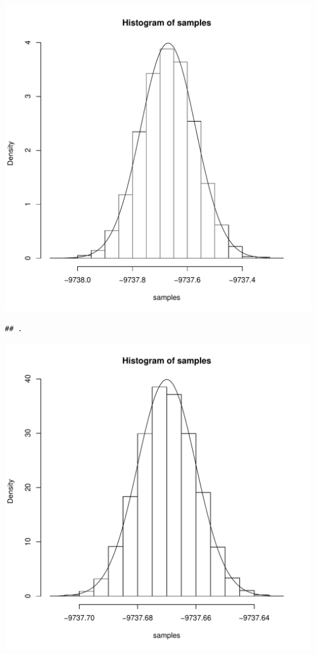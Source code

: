 \documentclass{llncs}\usepackage[]{graphicx}\usepackage[]{color}
\makeatletter
\def\maxwidth{ %
  \ifdim\Gin@nat@width>\linewidth
    \linewidth
  \else
    \Gin@nat@width
  \fi
}
\newenvironment{kframe}{%
 \def\at@end@of@kframe{}%
 \ifinner\ifhmode%
  \def\at@end@of@kframe{\end{minipage}}%
  \begin{minipage}{\columnwidth}%
 \fi\fi%
 \def\FrameCommand##1{\hskip\@totalleftmargin \hskip-\fboxsep
 \colorbox{shadecolor}{##1}\hskip-\fboxsep
     \hskip-\linewidth \hskip-\@totalleftmargin \hskip\columnwidth}%
 \MakeFramed {\advance\hsize-\width
   \@totalleftmargin\z@ \linewidth\hsize
   \@setminipage}}%
 {\par\unskip\endMakeFramed%
 \at@end@of@kframe}
\newenvironment{knitrout}{}{} %
\makeatother
\begin{document}
\begin{knitrout}
\begin{kframe}
{\ttfamily\noindent\color{warningcolor}{\#\# Warning in ks.test(samples, true\_cdf, ...): ties should not be present for the Kolmogorov-Smirnov test}}\end{kframe}
\includegraphics[width=\maxwidth]{figure/Rt-23} 
\begin{kframe}\begin{lstlisting}[basicstyle=\ttfamily,breaklines=true]
## .
\end{lstlisting}
\end{kframe}
\includegraphics[width=\maxwidth]{figure/Rt-24} 

\end{knitrout}
\end{document}
